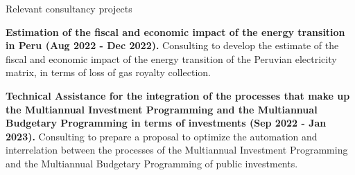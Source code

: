 \documentclass{resume} %
\begin{document}
\begin{rSection}{Relevant consultancy projects}
\item \textbf{Estimation of the fiscal and economic impact of the energy transition in Peru (Aug 2022 - Dec 2022).} {Consulting to develop the estimate of the fiscal and economic impact of the energy transition of the Peruvian electricity matrix, in terms of loss of gas royalty collection.}
\item \textbf{Technical Assistance for the integration of the processes that make up the Multiannual Investment Programming and the Multiannual Budgetary Programming in terms of investments (Sep 2022 - Jan 2023).} {Consulting to prepare a proposal to optimize the automation and interrelation between the processes of the Multiannual Investment Programming and the Multiannual Budgetary Programming of public investments.}

\end{rSection}
\end{document}
